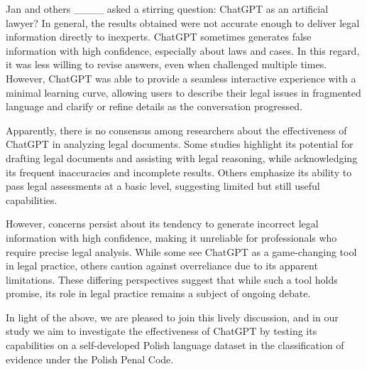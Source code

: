 Jan and others ____ asked a stirring question: ChatGPT as an artificial lawyer? In general, the results obtained were not accurate enough to deliver legal information directly to inexperts. ChatGPT sometimes generates false information with high confidence, especially about laws and cases. In this regard, it was less willing to revise answers, even when challenged multiple times. However, ChatGPT was able to provide a seamless interactive experience with a minimal learning curve, allowing users to describe their legal issues in fragmented language and clarify or refine details as the conversation progressed. 

Apparently, there is no consensus among researchers about the effectiveness of ChatGPT in analyzing legal documents. Some studies highlight its potential for drafting legal documents and assisting with legal reasoning, while acknowledging its frequent inaccuracies and incomplete results. Others emphasize its ability to pass legal assessments at a basic level, suggesting limited but still useful capabilities. 

However, concerns persist about its tendency to generate incorrect legal information with high confidence, making it unreliable for professionals who require precise legal analysis. While some see ChatGPT as a game-changing tool in legal practice, others caution against overreliance due to its apparent limitations. These differing perspectives suggest that while such a tool holds promise, its role in legal practice remains a subject of ongoing debate.

In light of the above, we are pleased to join this lively discussion, and in our study we aim to investigate the effectiveness of ChatGPT by testing its capabilities on a self-developed Polish language dataset in the classification of evidence under the Polish Penal Code.